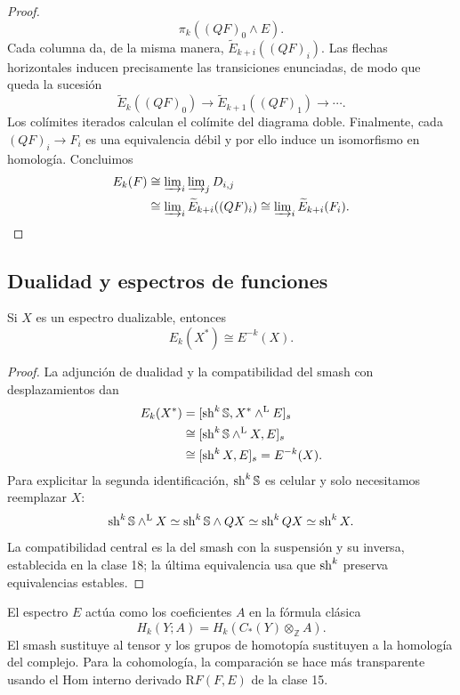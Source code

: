 \begin{proof}
\[\pi_k((QF)_0\wedge E).
\]
Cada columna da, de la misma manera, $\widetilde E_{k+i}((QF)_i)$. Las flechas horizontales inducen precisamente las transiciones enunciadas, de modo que queda la sucesión
\[
\widetilde E_k((QF)_0)\longrightarrow
\widetilde E_{k+1}((QF)_1)\longrightarrow\cdots.
\]
Los colímites iterados calculan el colímite del diagrama doble. Finalmente, cada $(QF)_i\to F_i$ es una equivalencia débil y por ello induce un isomorfismo en homología. Concluimos
\[
\begin{aligned}
E_k(F)&\cong\varinjlim\nolimits_i\varinjlim\nolimits_jD_{i,j}\\
&\cong\varinjlim\nolimits_i\widetilde E_{k+i}((QF)_i)
\cong\varinjlim\nolimits_i\widetilde E_{k+i}(F_i).
\end{aligned}
\]
\end{proof}

\subsection{Dualidad y espectros de funciones}
\begin{prop}\label{prop:c19-dualidad-homologia}
Si $X$ es un espectro dualizable, entonces
\[
E_k(X^*)\cong E^{-k}(X).
\]
\end{prop}
\begin{proof}
La adjunción de dualidad y la compatibilidad del smash con desplazamientos dan
\[
\begin{aligned}
E_k(X^*)&=[\operatorname{sh}^k\mathbb S,X^*\wedge^{\mathrm L}E]_s\\
&\cong[\operatorname{sh}^k\mathbb S\wedge^{\mathrm L}X,E]_s\\
&\cong[\operatorname{sh}^kX,E]_s=E^{-k}(X).
\end{aligned}
\]
Para explicitar la segunda identificación, $\operatorname{sh}^k\mathbb S$ es celular y solo necesitamos reemplazar $X$:
\[
\operatorname{sh}^k\mathbb S\wedge^{\mathrm L}X
\simeq\operatorname{sh}^k\mathbb S\wedge QX
\simeq\operatorname{sh}^kQX\simeq\operatorname{sh}^kX.
\]
La compatibilidad central es la del smash con la suspensión y su inversa, establecida en la clase 18; la última equivalencia usa que $\operatorname{sh}^k$ preserva equivalencias estables.
\end{proof}

El espectro $E$ actúa como los coeficientes $A$ en la fórmula clásica
\[
H_k(Y;A)=H_k(C_*(Y)\otimes_{\mathbb Z}A).
\]
El smash sustituye al tensor y los grupos de homotopía sustituyen a la homología del complejo. Para la cohomología, la comparación se hace más transparente usando el Hom interno derivado $\mathrm RF(F,E)$ de la clase 15.

